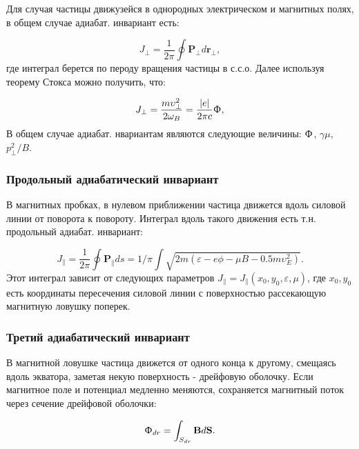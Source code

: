 \documentclass[10pt, a4paper]{article}
\begin{document}
Для случая частицы движузейся в однородных электрическом и магнитных полях, в общем случае адиабат. инвариант есть:

\begin{equation}
    \label{eq.4.3pf}
    J_{\perp} = \frac{1}{2\pi} \oint \mathbf{P}_{\perp} d\mathbf{r}_{\perp},
\end{equation}
где интеграл берется по пероду вращения частицы в с.с.о. Далее используя теорему Стокса можно получить, что:

\begin{equation}
    \label{eq.4.3pf}
    J_{\perp} = \frac{m\upsilon_{\perp}^2}{2\omega_B}=\frac{|e|}{2\pi c} \Upphi, 
\end{equation}
В общем случае адиабат. нвариантам являются следующие величины: $\Upphi$, $\gamma \mu$, $p_{\perp}^2/B$.

\subsubsection{Продольный адиабатический инвариант}
\label{sec.4.4.2}
В магнитных пробках, в нулевом приближении частица движется вдоль силовой линии от поворота к повороту. Интеграл вдоль
такого движения есть т.н. продольный адиабат. инвариант:

\begin{equation}
    \label{eq.4.3pf}
    J_{\parallel} = \frac{1}{2\pi}\oint\mathbf{P}_{\parallel}ds=1/\pi \int \sqrt{2m \left(\varepsilon - e\phi - \mu B - 0.5m\upsilon_E^2 \right)}. 
\end{equation}
Этот интеграл зависит от следующих параметров $J_{\parallel}=J_{\parallel}(x_0, y_0, \varepsilon, \mu)$, где $x_0, y_0$
есть координаты пересечения силовой линии с поверхностью рассекающую магнитную ловушку поперек.

\subsubsection{Третий адиабатический инвариант}
\label{sec.4.4.3}

В магнитной ловушке частица движется от одного конца к другому, смещаясь вдоль экватора, заметая некую поверхность - 
дрейфовую оболочку. Если магнитное поле и потенциал медленно меняются, сохраняется магнитный поток через сечение 
дрейфовой оболочки:

\begin{equation}
    \label{eq.4.3pf}
     \Upphi_{dr}= \int_{S_{dr}} \mathbf{B}d\mathbf{S}.
\end{equation}
\end{document}
